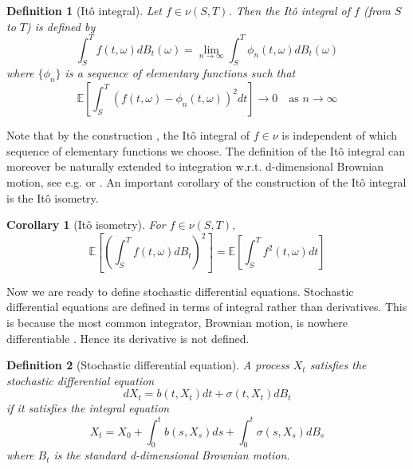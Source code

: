 \documentclass[12pt]{article}
\theoremstyle{break}
\newtheorem{definition}{Definition}[section]
\newtheorem{corollary}{Corollary}[section]
\begin{document}
\begin{definition}[Itô integral]
	Let $f \in \nu(S,T)$. Then the Itô integral of $f$ (from $S$ to $T$) is defined by
	\begin{equation}
		\int_S^T f(t, \omega)dB_t(\omega) = \lim_{n \to \infty} \int_S^T \phi_n(t, \omega)dB_t(\omega)
	\end{equation}
	where $\{\phi_n\}$ is a sequence of elementary functions such that
	\begin{equation}
		\mathbb{E}\left[\int_S^T(f(t, \omega) - \phi_n(t, \omega))^2dt\right] \to 0 \quad \text{as } n \to \infty
	\end{equation}
\end{definition}

Note that by the construction \cite{oksendal2013}, the Itô integral of $f \in \nu$ is independent of which sequence of elementary functions we choose. The definition of the Itô integral can moreover be naturally extended to integration w.r.t. d-dimensional Brownian motion, see e.g. \cite{oksendal2013} or \cite{karatzas1998}. An important corollary of the construction of the Itô integral is the Itô isometry.

\begin{corollary}[Itô isometry]
	For $f \in \nu(S, T)$,
	\begin{equation}
		\mathbb{E}\left[\left( \int_S^T f(t, \omega) dB_t \right)^2\right] = \mathbb{E}\left[ \int_S^T f^2(t, \omega)dt \right]
	\end{equation}
\end{corollary}

Now we are ready to define stochastic differential equations. Stochastic differential equations are defined in terms of integral rather than derivatives. This is because the most common integrator, Brownian motion, is nowhere differentiable \cite{karatzas1998}. Hence its derivative is not defined.

\begin{definition}[Stochastic differential equation]
	A process $X_t$ satisfies the stochastic differential equation
	\begin{equation}
		dX_t = b(t, X_t)dt + \sigma(t, X_t)dB_t
	\end{equation}
	if it satisfies the integral equation
	\begin{equation}
		\label{eq:sde}
		X_t = X_0 + \int_0^t b(s, X_s) ds + \int_0^t \sigma (s, X_s) dB_s
	\end{equation}
	where $B_t$ is the standard d-dimensional Brownian motion.
\end{definition}
\end{document}
